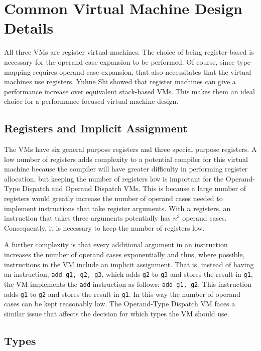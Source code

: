 \documentclass[english,a4paper,12pt]{report}
\begin{document}
\section{Common Virtual Machine Design Details}

All three VMs are register virtual machines. The choice of being
register-based is necessary for the operand case expansion to be
performed. Of course, since type-mapping requires operand case
expansion, that also necessitates that the virtual machines use
registers. Yuhne Shi\cite{Shi2007} showed that register machines can
give a performance increase over equivalent stack-based VMs. This
makes them an ideal choice for a performance-focused virtual machine
design.

\subsection{Registers and Implicit Assignment}
\label{reg-impl-assgn}
The VMs have six general purpose registers and three special purpose
registers. A low number of registers adds complexity to a potential
compiler for this virtual machine because the compiler will have
greater difficulty in performing register allocation, but keeping the
number of registers low is important for the Operand-Type Dispatch and
Operand Dispatch VMs. This is because a large number of registers
would greatly increase the number of operand cases needed to implement
instructions that take register arguments. With $n$ registers, an
instruction that takes three arguments potentially has $n^3$ operand
cases. Consequently, it is necessary to keep the number of registers
low.

A further complexity is that every additional argument in an
instruction increases the number of operand cases exponentially and
thus, where possible, instructions in the VM include an implicit
assignment. That is, instead of having an instruction,
\verb|add g1, g2, g3|, which adds \verb|g2| to \verb|g3| and stores
the result in \verb|g1|, the VM implements the \verb|add| instruction
as follows: \verb|add g1, g2|. This instruction adds \verb|g1| to
\verb|g2| and stores the result in \verb|g1|. In this way the number
of operand cases can be kept reasonably low. The Operand-Type Dispatch
VM faces a similar issue that affects the decision for which types the
VM should use.

\subsection{Types}
\end{document}
